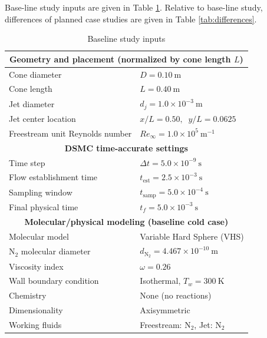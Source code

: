 \documentclass[11pt]{article}
\begin{document}
Base-line study inputs are given in Table \ref{tab:baselineInputs}. Relative to base-line study, differences of planned case studies are given in Table \ref{tab:differences}.
\begin{table}[t]
\centering
\small
\setlength{\tabcolsep}{6pt}
\renewcommand{\arraystretch}{1.15}
\begin{tabular}{l l}
\hline
\multicolumn{2}{c}{\textbf{Geometry and placement (normalized by cone length $L$)}}\\
\hline
Cone diameter & $D = 0.10~\mathrm{m}$ \\
Cone length & $L = 0.40~\mathrm{m}$ \\
Jet diameter & $d_j = 1.0\times 10^{-3}~\mathrm{m}$ \\
Jet center location & $x/L = 0.50,\;\; y/L = 0.0625$ \\
Freestream unit Reynolds number & $Re_\infty = 1.0\times 10^{5}~\mathrm{m^{-1}}$ \\
\hline
\multicolumn{2}{c}{\textbf{DSMC time-accurate settings}}\\
\hline
Time step & $\Delta t = 5.0\times 10^{-9}~\mathrm{s}$ \\
Flow establishment time & $t_{\mathrm{est}} = 2.5\times 10^{-3}~\mathrm{s}$ \\
Sampling window & $t_{\mathrm{samp}} = 5.0\times 10^{-4}~\mathrm{s}$ \\
Final physical time & $t_f = 5.0\times 10^{-3}~\mathrm{s}$ \\
\hline
\multicolumn{2}{c}{\textbf{Molecular/physical modeling (baseline cold case)}}\\
\hline
Molecular model & Variable Hard Sphere (VHS) \\
$\mathrm{N_2}$ molecular diameter & $d_{\mathrm{N_2}} = 4.467\times 10^{-10}~\mathrm{m}$ \\
Viscosity index & $\omega = 0.26$ \\
Wall boundary condition & Isothermal, $T_w = 300~\mathrm{K}$ \\
Chemistry & None (no reactions) \\
Dimensionality & Axisymmetric \\
Working fluids & Freestream: $\mathrm{N_2}$,\;\; Jet: $\mathrm{N_2}$ \\
\hline
\end{tabular}
\caption{Baseline study inputs}
\label{tab:baselineInputs}
\end{table}
\end{document}
